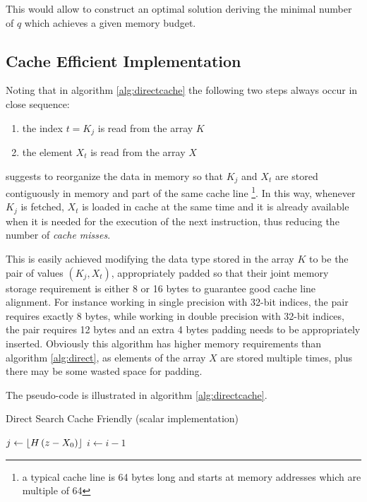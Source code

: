 \documentclass[preprint,1p,times]{elsarticle}
\begin{document}
This would allow to construct an optimal solution deriving the minimal number of $q$ which achieves a given memory budget.

\subsection{Cache Efficient Implementation}
Noting that in algorithm \ref{alg:directcache} the following two steps always occur in close sequence:
\begin{enumerate}
	\item the index $t=K_j$ is read from the array $K$
	\item the element $X_t$ is read from the array $X$
\end{enumerate}
suggests to reorganize the data in memory so that $K_j$ and $X_t$ are stored contiguously in memory and part of the same cache line \footnote{a typical cache line is 64 bytes long and starts at memory addresses which are multiple of 64}. In this way, whenever $K_j$ is fetched, $X_t$ is loaded in cache at the same time and it is already available when it is needed for the execution of the next instruction, thus reducing the number of \textit{cache misses}.

This is easily achieved modifying the data type stored in the array $K$ to be the pair of values $(K_j,X_t)$, appropriately padded so that their joint memory storage requirement is either 8 or 16 bytes to guarantee good cache line alignment. For instance working in single precision with 32-bit indices, the pair requires exactly 8 bytes, while working in double precision with 32-bit indices, the pair requires 12 bytes and an extra 4 bytes padding needs to be appropriately inserted. Obviously this algorithm has higher memory requirements than algorithm \ref{alg:direct}, as elements of the array $X$ are stored multiple times, plus there may be some wasted space for padding.

The pseudo-code is illustrated in algorithm \ref{alg:directcache}.

\begin{algorithm}
	\caption{Direct Search Cache Friendly (scalar implementation)}
	\label{alg:directcache}
	\begin{algorithmic}
		\State $j \leftarrow \left \lfloor  H \, (z-X_0)  \right \rfloor$
		 
			\State $i \leftarrow i-1$ 
		\EndIf
		\EndFunction
	\end{algorithmic}
\end{algorithm}
\end{document}
